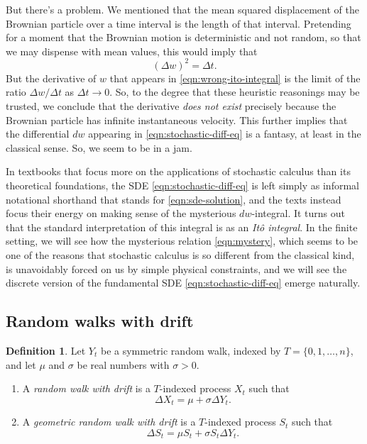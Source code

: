 \documentclass[11pt]{book}
\theoremstyle{definition}
\newtheorem{defn}[thm]{Definition}
\numberwithin{equation}{section}
\begin{document}
But there's a problem. We mentioned that the mean squared displacement of the Brownian particle over a time interval is the length of that interval. Pretending for a moment that the Brownian motion is deterministic and not random, so that we may dispense with mean values, this would imply that
\begin{equation} \label{eqn:mystery}
	(\Delta w)^2 = \Delta t.
\end{equation}
But the derivative of $w$ that appears in \eqref{eqn:wrong-ito-integral} is the limit of the ratio $\Delta w / \Delta t$ as $\Delta t \to 0$. So, to the degree that these heuristic reasonings may be trusted, we conclude that the derivative \textit{does not exist} precisely because the Brownian particle has infinite instantaneous velocity. This further implies that the differential $dw$ appearing in \eqref{eqn:stochastic-diff-eq} is a fantasy, at least in the classical sense. So, we seem to be in a jam.

In textbooks that focus more on the applications of stochastic calculus than its theoretical foundations, the SDE \eqref{eqn:stochastic-diff-eq} is left simply as informal notational shorthand that stands for \eqref{eqn:sde-solution}, and the texts instead focus their energy on making sense of the mysterious $dw$-integral. It turns out that the standard interpretation of this integral is as an \textit{Itô integral}. In the finite setting, we will see how the mysterious relation \eqref{eqn:mystery}, which seems to be one of the reasons that stochastic calculus is so different from the classical kind, is unavoidably forced on us by simple physical constraints, and we will see the discrete version of the fundamental SDE \eqref{eqn:stochastic-diff-eq} emerge naturally.

\subsection{Random walks with drift}

\begin{defn}
Let $Y_t$ be a symmetric random walk, indexed by $T = \{0,1,\ldots,n\}$, and let $\mu$ and $\sigma$ be real numbers with $\sigma>0$.
\begin{enumerate}
\item A \textit{random walk with drift} is a $T$-indexed process $X_t$ such that
\[
	\Delta X_t = \mu + \sigma \Delta Y_t.
\]
\item A \textit{geometric random walk with drift} is a $T$-indexed process $S_t$ such that
\[
	\Delta S_t = \mu S_t + \sigma S_t \Delta Y_t.
\]
\end{enumerate}
\end{defn}


\cleardoublepage
{}
{}


\end{document}
